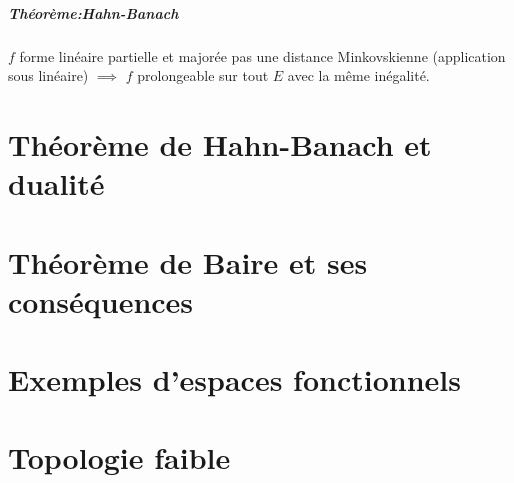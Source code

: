 \documentclass[a4paper, 11pt, french]{book}
\theoremstyle{plain} %
\theoremstyle{definition} %
\theoremstyle{remark} %
\newcommand{\1}{\mathds{1}}
\begin{document}
\paragraph{Théorème:Hahn-Banach} $f$ forme linéaire partielle et majorée pas une distance Minkovskienne (application sous linéaire) $\implies$ $f$ prolongeable sur tout $E$ avec la même inégalité.

\chapter{Théorème de Hahn-Banach et dualité}

\chapter{Théorème de Baire et ses conséquences}

\chapter{Exemples d'espaces fonctionnels}

\chapter{Topologie faible}
\end{document}

